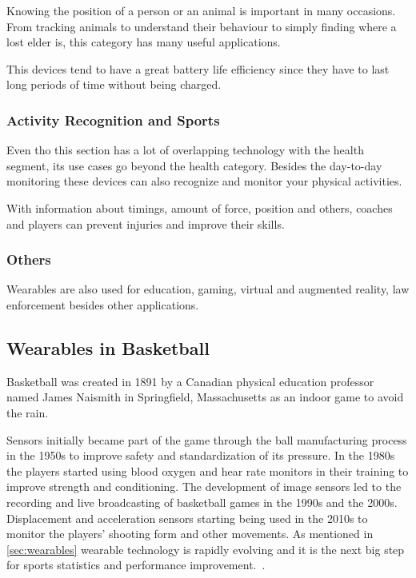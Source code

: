 Knowing the position of a person or an animal is important in many occasions. From tracking animals to understand their behaviour to simply finding where a lost elder is, this category has many useful applications.

This devices tend to have a great battery life efficiency since they have to last long periods of time without being charged. 

\subsubsection{Activity Recognition and Sports}
\label{ssub:activityRecognitionAndSports}

Even tho this section has a lot of overlapping technology with the health segment, its use cases go beyond the health category. Besides the day-to-day monitoring these devices can also recognize and monitor your physical activities.

With information about timings, amount of force, position and others, coaches and players can prevent injuries and improve their skills.

\subsubsection{Others}
\label{ssub:others}

Wearables are also used for education, gaming, virtual and augmented reality, law enforcement besides other applications.

\newpage

\subsection{Wearables in Basketball}
\label{sub:wearablesInBasketball}

Basketball was created in 1891 by a Canadian physical education professor named James Naismith in Springfield, Massachusetts as an indoor game to avoid the rain. 

Sensors initially became part of the game through the ball manufacturing process in the 1950s to improve safety and standardization of its pressure. In the 1980s the players started 
using blood oxygen and hear rate monitors in their training to improve strength and conditioning. The development of image sensors led to the recording and live broadcasting of basketball 
games in the 1990s and the 2000s. Displacement and acceleration sensors starting being used in the 2010s to monitor the players' shooting form and other movements. As mentioned in \autoref{sec:wearables} 
wearable technology is rapidly evolving and it is the next big step for sports statistics and performance improvement.~\cite{perspective}.

